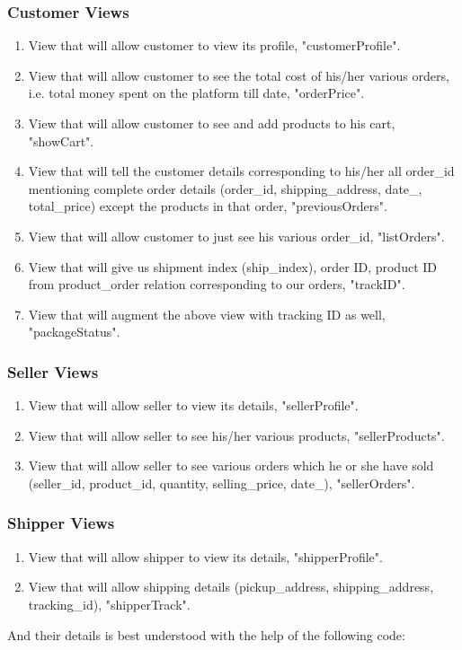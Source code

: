 \documentclass[a4paper,12pt]{article}
\begin{document}
\subsubsection{Customer Views}
\begin{enumerate}
  \item View that will allow customer to view its profile, "customerProfile".
  \item View that will allow customer to see the total cost of his/her various orders, i.e. total money spent on the platform till date, "orderPrice". 
  \item View that will allow customer to see and add products to his cart, "showCart".
  \item View that will tell the customer details corresponding to his/her all order\_id mentioning complete order details (order\_id, shipping\_address, date\_, total\_price) except the products in that order, "previousOrders". 
  \item View that will allow customer to just see his various order\_id, "listOrders". 
  \item View that will give us shipment index (ship\_index), order ID, product ID from product\_order relation corresponding to our orders, "trackID".
  \item View that will augment the above view with tracking ID as well, "packageStatus".
\end{enumerate}
\subsubsection{Seller Views}
\begin{enumerate}
  \item View that will allow seller to view its details, "sellerProfile".
  \item View that will allow seller to see his/her various products, "sellerProducts".
  \item View that will allow seller to see various orders which he or she have sold (seller\_id, product\_id, quantity, selling\_price, date\_), "sellerOrders".
\end{enumerate}
\subsubsection{Shipper Views}
\begin{enumerate}
  \item View that will allow shipper to view its details, "shipperProfile".
  \item View that will allow shipping details (pickup\_address, shipping\_address, tracking\_id), "shipperTrack".
\end{enumerate}
And their details is best understood with the help of the following code:
\end{document}
